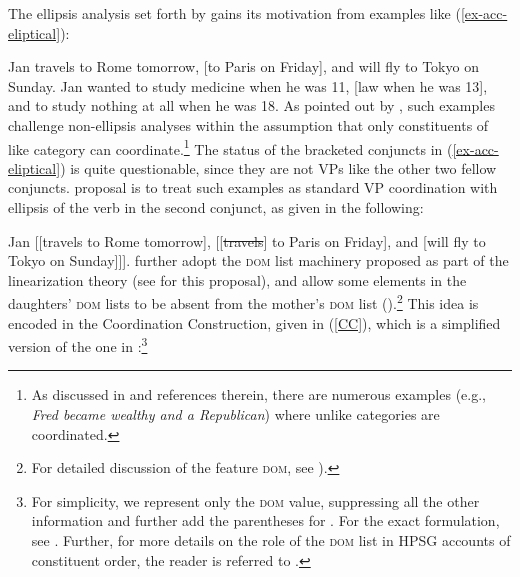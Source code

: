 The ellipsis analysis set forth by \citet{Beavers2004} gains its motivation 
from examples like  (\ref{ex-acc-eliptical}):%

\eal
\label{ex-acc-eliptical}
\ex Jan travels to Rome tomorrow, [to Paris on Friday], and will fly to Tokyo
on Sunday. \label{acc2}
\ex Jan wanted to study medicine when he was 11, [law when he was 13],
and to study nothing at all when he was 18. \label{acc3}\zl
%
As pointed out by \citet{Beavers2004}, such examples challenge non-ellipsis analyses within the assumption that only 
constituents of like category can coordinate.\footnote{As discussed in 
  and references therein, there are numerous examples (e.g., \textit{Fred became wealthy and a Republican}) where unlike categories are coordinated.}
The status of the bracketed conjuncts in (\ref{ex-acc-eliptical}) is quite questionable, since they are not VPs like the other two fellow conjuncts.  proposal is to treat such examples as standard VP coordination with ellipsis of the verb in the second conjunct, as
given in the following:

\ea
\label{strike-ex}
 Jan [[travels to Rome tomorrow], [[\sout{travels}] to Paris on Friday], and [will fly to Tokyo on Sunday]]].
\z 
%
\citet{Beavers2004} further adopt the \textsc{dom} list
machinery proposed as part of the linearization theory (see  \citealt{Crysmann2003a} for this proposal), and
allow some elements in the daughters' \textsc{dom} lists to be absent from 
the mother's \textsc{dom} list (\citealt{Yatabe2001,Crysmann2003a}).\footnote{For detailed discussion of the feature \textsc{dom}, see ).} 
%
%
This idea is encoded in the Coordination Construction, given in (\ref{CC}), which is a simplified
version of the one in \citep[27]{Beavers2004}:\footnote{For simplicity, we represent only the \textsc{dom} value, suppressing all the other information and further add the parentheses for . 
For the exact formulation, see \citet{Beavers2004}. Further, for 
more details on the role of the \textsc{dom} list in HPSG accounts of constituent order, the reader is referred to .}
%

